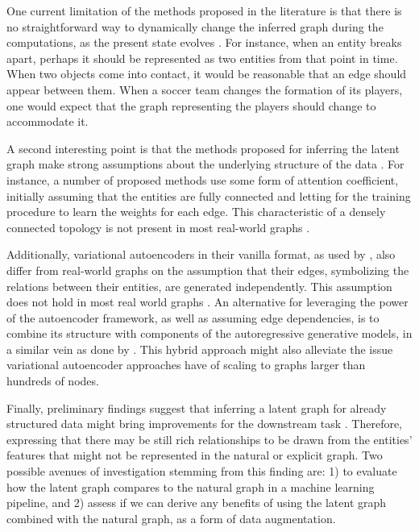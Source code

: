 \documentclass[12pt,a4paper]{article}
\begin{document}
	One current limitation of the methods proposed in the literature is that there is no straightforward way to dynamically change the inferred graph during the computations, as the present state evolves \citep{Battaglia2018}. For instance, when an entity breaks apart, perhaps it should be represented as two entities from that point in time. When two objects come into contact, it would be reasonable that an edge should appear between them. When a soccer team changes the formation of its players, one would expect that the graph representing the players should change to accommodate it.

	A second interesting point is that the methods proposed for inferring the latent graph make strong assumptions about the underlying structure of the data \citep{Hamilton2020}. For instance, a number of proposed methods \citep{Watters2017, VanSteenkiste2018} use some form of attention coefficient, initially assuming that the entities are fully connected and letting for the training procedure to learn the weights for each edge. This characteristic of a densely connected topology is not present in most real-world graphs \citep{Newman2019}.

	Additionally, variational autoencoders in their vanilla format, as used by \textcite{KipfNRI2018}, also differ from real-world graphs on the assumption that their edges, symbolizing the relations between their entities, are generated independently. This assumption does not hold in most real world graphs \citep{Hamilton2020}. An alternative for leveraging the power of the autoencoder framework, as well as assuming edge dependencies, is to combine its structure with components of the autoregressive generative models, in a similar vein as done by \textcite{Jin2018}. This hybrid approach might also alleviate the issue variational autoencoder approaches have of scaling to graphs larger than hundreds of nodes.

	Finally, preliminary findings suggest that inferring a latent graph for already structured data might bring improvements for the downstream task \citep{KipfNRI2018}. Therefore, expressing that there may be still rich relationships to be drawn from the entities’ features that might not be represented in the natural or explicit graph. Two possible avenues of investigation stemming from this finding are: 1) to evaluate how the latent graph compares to the natural graph in a machine learning pipeline, and 2) assess if we can derive any benefits of using the latent graph combined with the natural graph, as a form of data augmentation.
\end{document}
